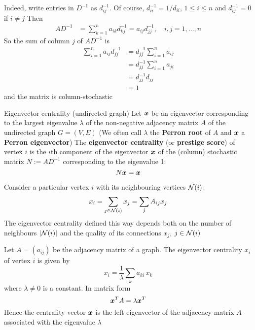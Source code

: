 \documentclass[aspectratio=169]{beamer}\usepackage[]{graphicx}\usepackage[]{xcolor}
\begin{document}
\begin{frame}
	Indeed, write entries in $D^{-1}$ as $d_{ij}^{-1}$. Of course, $d_{ii}^{-1} = 1/d_{ii}$, $1\leq i\leq n$ and $d_{ij}^{-1} = 0$ if $i\neq j$
	\vfill
	Then
	\begin{align*}
		AD^{-1} &= \sum_{k=1}^n a_{ik}d_{kj}^{-1}
		= a_{ij}d_{jj}^{-1}
		,\quad i,j=1,\ldots,n
	\end{align*}
	So the sum of column $j$ of $AD^{-1}$ is 
	\begin{align*}
		\sum_{i=1}^n a_{ij}d_{jj}^{-1} 
		&= d_{jj}^{-1} \sum_{i=1}^n a_{ij} \\
		&= d_{jj}^{-1} \sum_{i=1}^n a_{ji} \\
		&= d_{jj}^{-1} d_{jj} \\
		&= 1
	\end{align*}
	and the matrix is column-stochastic
\end{frame}
	
\begin{frame}{Eigenvector centrality (undirected graph)}
Let $\bm{x}$ be an eigenvector corresponding to the largest eigenvalue $\lambda$ of the non-negative adjacency matrix $A$ of the undirected graph $G = (V, E)$
\vfill
(We often call $\lambda$ the \textbf{Perron root} of $A$ and $\bm{x}$ a \textbf{Perron eigenvector})
\vfill
The \textbf{eigenvector centrality} (or \textbf{prestige score}) of vertex $i$ is the $i$th component of the eigenvector $\bm{x}$ of the (column) stochastic matrix $N := AD^{-1}$ corresponding to the eigenvalue 1:
\[
	N\bm{x} = \bm{x}
\]
\end{frame}

\begin{frame}
Consider a particular vertex $i$ with its neighbouring vertices $\mathcal{N}(i)$:
\[
	x_i = \sum_{j\in\mathcal{N}(i)} x_j 
	= \sum_j A_{ij} x_j	
\]
\vfill
The eigenvector centrality defined this way depends both on the number of neighbours $|\mathcal{N}(i)|$ and the quality of its connections $x_j$, $j\in\mathcal{N}(i)$
\end{frame}

\begin{frame}
	Let $A = (a_{ij})$ be the adjacency matrix of a graph. The eigenvector centrality $x_{i}$ of vertex $i$ is given by
	$$
	x_i = \frac{1}{\lambda} \sum_k a_{ki} \, x_k
	$$ 
	where $\lambda \neq 0$ is a constant. In matrix form
	$$
	\bm{x}^T A=\lambda\bm{x}^T
	$$
\vfill
Hence the centrality vector $\bm{x}$ is the left eigenvector of the adjacency matrix $A$ associated with the eigenvalue $\lambda$
\end{frame}
\end{document}
